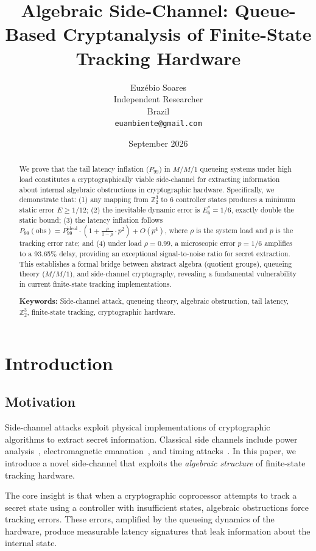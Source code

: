 \documentclass[11pt]{article}
\title{Algebraic Side-Channel: Queue-Based Cryptanalysis of Finite-State Tracking Hardware}
\author{Euz\'{e}bio Soares \\
Independent Researcher \\
Brazil \\
\texttt{euambiente@gmail.com}}
\date{September 2026}
\begin{document}
\maketitle

\begin{abstract}
We prove that the tail latency inflation ($P_{99}$) in $M/M/1$ queueing systems under high load constitutes a cryptographically viable side-channel for extracting information about internal algebraic obstructions in cryptographic hardware. Specifically, we demonstrate that: (1) any mapping from $\mathbb{Z}_2^3$ to 6 controller states produces a minimum static error $E \geq 1/12$; (2) the inevitable dynamic error is $E_6^* = 1/6$, exactly double the static bound; (3) the latency inflation follows $P_{99}(\text{obs}) = P_{99}^{\text{ideal}} \cdot (1 + \frac{\rho}{1-\rho} \cdot p^2) + O(p^4)$, where $\rho$ is the system load and $p$ is the tracking error rate; and (4) under load $\rho = 0.99$, a microscopic error $p = 1/6$ amplifies to a 93.65\% delay, providing an exceptional signal-to-noise ratio for secret extraction. This establishes a formal bridge between abstract algebra (quotient groups), queueing theory ($M/M/1$), and side-channel cryptography, revealing a fundamental vulnerability in current finite-state tracking implementations.

\textbf{Keywords:} Side-channel attack, queueing theory, algebraic obstruction, tail latency, $\mathbb{Z}_2^3$, finite-state tracking, cryptographic hardware.
\end{abstract}

\section{Introduction}

\subsection{Motivation}

Side-channel attacks exploit physical implementations of cryptographic algorithms to extract secret information. Classical side channels include power analysis~\cite{kocher1999}, electromagnetic emanation~\cite{gandolfi2001}, and timing attacks~\cite{kocher1996}. In this paper, we introduce a novel side-channel that exploits the \textit{algebraic structure} of finite-state tracking hardware.

The core insight is that when a cryptographic coprocessor attempts to track a secret state using a controller with insufficient states, algebraic obstructions force tracking errors. These errors, amplified by the queueing dynamics of the hardware, produce measurable latency signatures that leak information about the internal state.
\end{document}
